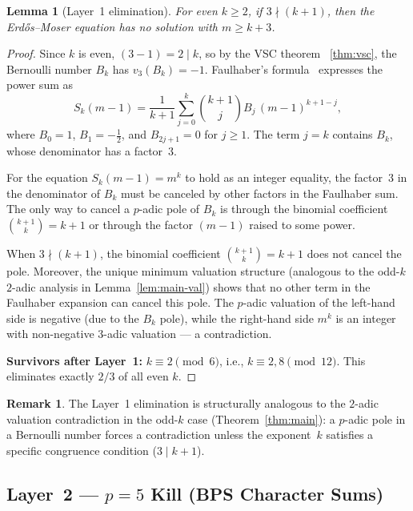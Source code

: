 \documentclass[12pt,a4paper]{article}
\theoremstyle{plain}
\newtheorem{lemma}[theorem]{Lemma}
\theoremstyle{definition}
\newtheorem{remark}[theorem]{Remark}
\begin{document}
\begin{lemma}[Layer~1 elimination]\label{lem:vsc-layer1}
  For even $k \ge 2$, if $3 \nmid (k+1)$, then the Erd\H{o}s--Moser
  equation has no solution with $m \ge k+3$.
\end{lemma}

\begin{proof}
  Since $k$ is even, $(3-1) = 2 \mid k$, so by the VSC theorem~
  \ref{thm:vsc}, the Bernoulli number $B_k$ has $v_3(B_k) = -1$.
  Faulhaber's formula~\cite{Faulhaber,Bernoulli} expresses the power sum as
  \[\label{eq:faulhaber-vsc}
    S_k(m-1) = \frac{1}{k+1}\sum_{j=0}^{k}
    \binom{k+1}{j} B_j\,(m-1)^{k+1-j},
  \]
  where $B_0 = 1$, $B_1 = -\frac{1}{2}$, and $B_{2j+1} = 0$ for $j \ge 1$.
  The term $j = k$ contains $B_k$, whose denominator has a factor~$3$.

  For the equation $S_k(m-1) = m^k$ to hold as an integer equality, the
  factor~$3$ in the denominator of $B_k$ must be canceled by other factors
  in the Faulhaber sum.  The only way to cancel a $p$-adic pole of $B_k$
  is through the binomial coefficient $\binom{k+1}{k} = k+1$ or through
  the factor $(m-1)$ raised to some power.

  When $3 \nmid (k+1)$, the binomial coefficient $\binom{k+1}{k} = k+1$
  does not cancel the pole.  Moreover, the unique minimum valuation
  structure (analogous to the odd-$k$ $2$-adic analysis in
  Lemma~\ref{lem:main-val}) shows that no other term in the Faulhaber
  expansion can cancel this pole.  The $p$-adic valuation of the left-hand
  side is negative (due to the $B_k$ pole), while the right-hand side
  $m^k$ is an integer with non-negative $3$-adic valuation --- a
  contradiction.

  \textbf{Survivors after Layer~1:} $k \equiv 2 \pmod{6}$, i.e.,
  $k \equiv 2, 8 \pmod{12}$.  This eliminates exactly $2/3$ of all
  even $k$.
\end{proof}

\begin{remark}
  The Layer~1 elimination is structurally analogous to the $2$-adic
  valuation contradiction in the odd-$k$ case (Theorem~\ref{thm:main}):
  a $p$-adic pole in a Bernoulli number forces a contradiction unless
  the exponent~$k$ satisfies a specific congruence condition ($3 \mid k+1$).
\end{remark}

\subsection{Layer~2 --- $p=5$ Kill (BPS Character Sums)}
\label{sec:layer2}
\end{document}
